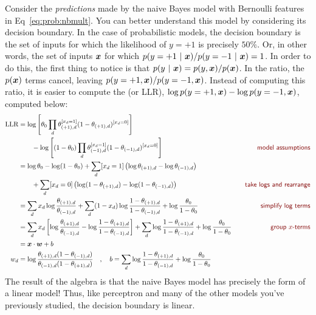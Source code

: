 Consider the \emph{predictions} made by the naive Bayes model with
Bernoulli features in Eq~\eqref{eq:prob:nbmult}.  You can better
understand this model by considering its decision boundary.  In the
case of probabilistic models, the decision boundary is the set of
inputs for which the likelihood of $y=+1$ is precisely $50\%$.  Or, in
other words, the set of inputs ${\boldsymbol{x}}$ for which $p(y=+1 \textrm{~}\arrowvert\textrm{~} {\boldsymbol{x}}) /
p(y=-1 \textrm{~}\arrowvert\textrm{~} {\boldsymbol{x}}) = 1$.  In order to do this, the first thing to notice
is that $p(y \textrm{~}\arrowvert\textrm{~} {\boldsymbol{x}}) = p(y,{\boldsymbol{x}}) / p({\boldsymbol{x}})$.  In the ratio, the $p({\boldsymbol{x}})$
terms cancel, leaving $p(y=+1,{\boldsymbol{x}}) / p(y=-1,{\boldsymbol{x}})$.  Instead of
computing this ratio, it is easier to compute the
 (or LLR), $\log p(y=+1,{\boldsymbol{x}}) - \log
p(y=-1,{\boldsymbol{x}})$, computed below:
%
\begin{align}
\text{LLR}
&= \log \left[ \th_0 \prod_d \th_{(+1),d}^{[x_d=1]} (1-\th_{(+1),d})^{[x_d=0]} \right] \nonumber\\
&\qquad - \log \left[ (1-\th_0) \prod_d \th_{(-1),d}^{[x_d=1]} (1-\th_{(-1),d})^{[x_d=0]} \right]
   \becauseof{model assumptions} \\
&= \log \th_0 - \log (1-\th_0)  + \sum_d [x_d=1] \left( \log \th_{(+1),d} - \log \th_{(-1),d} \right) \nonumber\\
&\qquad+ \sum_d [x_d=0] \left( \log (1-\th_{(+1),d}) - \log (1-\th_{(-1),d}) \right)
   \becauseof{take logs and rearrange} \\
&= \sum_d x_d \log \frac {\th_{(+1),d}} {\th_{(-1),d}}
 + \sum_d (1-x_d) \log \frac {1-\th_{(+1),d}} {1-\th_{(-1),d}}
 + \log \frac {\th_0} {1-\th_0}
    \becauseof{simplify log terms} \\
&= \sum_d x_d \left[ \log \frac {\th_{(+1),d}} {\th_{(-1),d}} - \log \frac {1-\th_{(+1),d}} {1-\th_{(-1),d}} \right]
 + \sum_d \log \frac {1-\th_{(+1),d}} {1-\th_{(-1),d}}
 + \log \frac {\th_0} {1-\th_0}
    \becauseof{group $x$-terms} \\
&= \dotp{\vx}{\vw} + b \\
w_d &= \log \frac {\th_{(+1),d} (1-\th_{(-1),d})} {\th_{(-1),d} (1-\th_{(+1),d})}
\quad,\quad
b   = \sum_d \log \frac {1-\th_{(+1),d}} {1-\th_{(-1),d}}
 + \log \frac {\th_0} {1-\th_0}
\end{align}
%
The result of the algebra is that the naive Bayes model has precisely
the form of a linear model!  Thus, like perceptron and many of the
other models you've previously studied, the decision boundary is linear.


